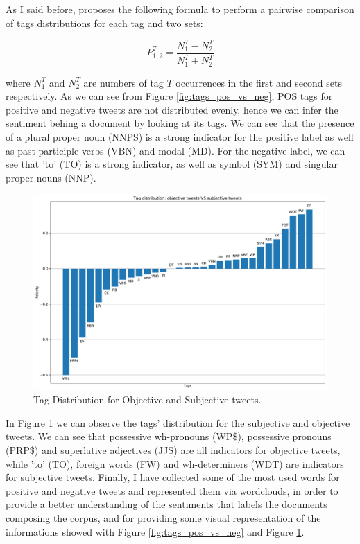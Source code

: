 \documentclass[11pt,twocolumn]{article}
\begin{document}
        \noindent
        As I said before, \cite{twitter_as_a_corpus} proposes the following formula to perform a pairwise
        comparison of tags distributions for each tag and two sets:

        \begin{equation*}
            P_{1, 2}^T = \frac{N_1^T - N_2^T}{N_1^T + N_2^T}
        \end{equation*}

        \noindent
        where $N_1^T$ and $N_2^T$ are numbers of tag $T$ occurrences in the first and second sets respectively.
        As we can see from Figure \ref{fig:tags_pos_vs_neg}, POS tags for positive and negative tweets are not
        distributed evenly, hence we can infer the sentiment behing a document by looking at its tags. We can
        see that the presence of a plural proper noun (NNPS) is a strong indicator for the positive label as
        well as past participle verbs (VBN) and modal (MD). For the negative label, we can see that 'to' (TO)
        is a strong indicator, as well as symbol (SYM) and singular proper nouns (NNP).

        \begin{figure}[h]
            \centering
            \includegraphics[width=\linewidth]{tag_distribution_objective_vs_subjective.pdf}
            \caption{Tag Distribution for Objective and Subjective tweets.}
            \label{fig:tags_obj_vs_subj}
        \end{figure}

        \noindent
        In Figure \ref{fig:tags_obj_vs_subj} we can observe the tags' distribution for the subjective and
        objective tweets. We can see that possessive wh-pronouns (WP\$), possessive pronouns (PRP\$) and
        superlative adjectives (JJS) are all indicators for objective tweets, while 'to' (TO), foreign words
        (FW) and wh-determiners (WDT) are indicators for subjective tweets. Finally, I have collected some of
        the most used words for positive and negative tweets and represented them via wordclouds, in order to
        provide a better understanding of the sentiments that labels the documents composing the corpus, and for
        providing some visual representation of the informations showed with Figure \ref{fig:tags_pos_vs_neg}
        and Figure \ref{fig:tags_obj_vs_subj}.
\end{document}

